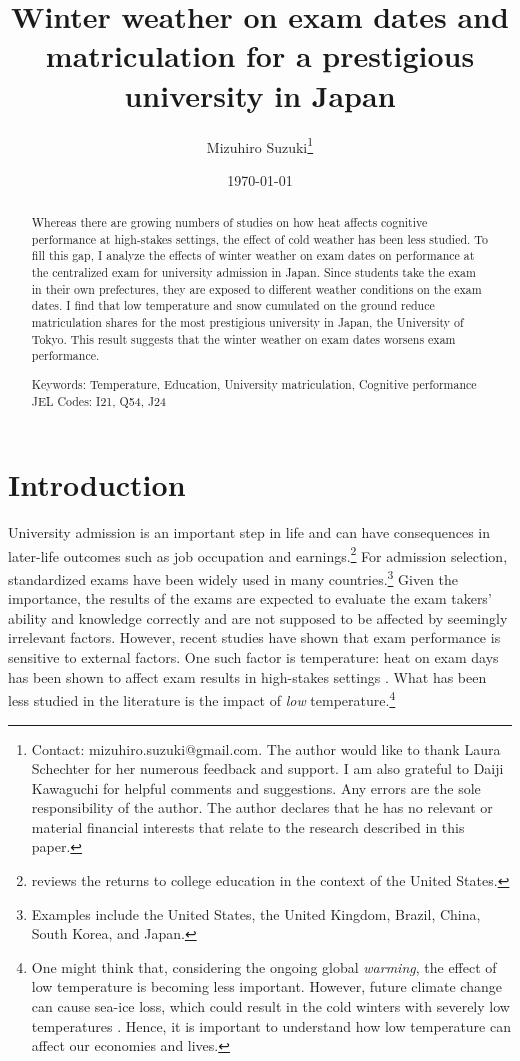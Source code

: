 \documentclass[12pt,letterpaper]{article}
\title{Winter weather on exam dates and matriculation for a prestigious university in Japan}
\author{
  Mizuhiro Suzuki\thanks{
    Contact: mizuhiro.suzuki@gmail.com.
    The author would like to thank Laura Schechter for her numerous feedback and support.
    I am also grateful to Daiji Kawaguchi for helpful comments and suggestions.
    Any errors are the sole responsibility of the author.
    The author declares that he has no relevant or material financial interests that relate to the research described in this paper.
  }
}
\date{\today}
\begin{document}
  
\maketitle
\begin{abstract}
  \singlespacing
    \noindent 
    Whereas there are growing numbers of studies on how heat affects cognitive performance at high-stakes settings, the effect of cold weather has been less studied.
    To fill this gap, I analyze the effects of winter weather on exam dates on performance at the centralized exam for university admission in Japan.
    Since students take the exam in their own prefectures, they are exposed to different weather conditions on the exam dates. 
    I find that low temperature and snow cumulated on the ground reduce matriculation shares for the most prestigious university in Japan, the University of Tokyo.
    This result suggests that the winter weather on exam dates worsens exam performance. 

  \medskip
  \vspace{1cm}
  \noindent Keywords: Temperature, Education, University matriculation, Cognitive performance
  \vspace{1cm}
  JEL Codes: I21, Q54, J24
\end{abstract}

\newpage

\section{Introduction}

University admission is an important step in life and can have consequences in later-life outcomes such as job occupation and earnings.\footnote{
  \citet{Hout2012} reviews the returns to college education in the context of the United States.
}
For admission selection, standardized exams have been widely used in many countries.\footnote{
  Examples include the United States, the United Kingdom, Brazil, China, South Korea, and Japan.
}
Given the importance, the results of the exams are expected to evaluate the exam takers' ability and knowledge correctly and are not supposed to be affected by seemingly irrelevant factors.
However, recent studies have shown that exam performance is sensitive to external factors.
One such factor is temperature:
heat on exam days has been shown to affect exam results in high-stakes settings \citep{Park2020a, GraffZivin2020, Melo2019}.
What has been less studied in the literature is the impact of \textit{low} temperature.\footnote{
  One might think that, considering the ongoing global \textit{warming}, the effect of low temperature is becoming less important.
  However, future climate change can cause sea-ice loss, which could result in the cold winters with severely low temperatures \citep{Kretschmer2016, Kim2014}.
  Hence, it is important to understand how low temperature can affect our economies and lives.
}
\end{document}
